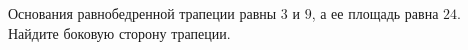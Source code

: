 \begin{ex}
	\begin{condition}
		 Основания равнобедренной трапеции равны \( 3  \) и \( 9 \), а ее площадь равна \( 24 \). Найдите боковую сторону трапеции.
	\end{condition}
\end{ex}